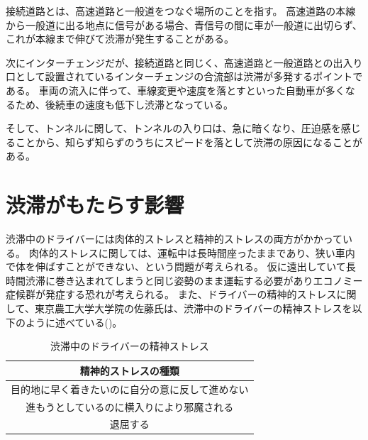 接続道路とは、高速道路と一般道をつなぐ場所のことを指す。
高速道路の本線から一般道に出る地点に信号がある場合、青信号の間に車が一般道に出切らず、これが本線まで伸びて渋滞が発生することがある\cite{zurich}。

次にインターチェンジだが、接続道路と同じく、高速道路と一般道路との出入り口として設置されているインターチェンジの合流部は渋滞が多発するポイントである\cite{zurich}。
車両の流入に伴って、車線変更や速度を落とすといった自動車が多くなるため、後続車の速度も低下し渋滞となっている。

そして、トンネルに関して、トンネルの入り口は、急に暗くなり、圧迫感を感じることから、知らず知らずのうちにスピードを落として渋滞の原因になることがある\cite{zurich}。

\newpage


\section{渋滞がもたらす影響}
渋滞中のドライバーには肉体的ストレスと精神的ストレスの両方がかかっている。
肉体的ストレスに関しては、運転中は長時間座ったままであり、狭い車内で体を伸ばすことができない、という問題が考えられる。
仮に遠出していて長時間渋滞に巻き込まれてしまうと同じ姿勢のまま運転する必要がありエコノミー症候群が発症する恐れが考えられる。
また、ドライバーの精神的ストレスに関して、東京農工大学大学院の佐藤氏\cite{alma99344256104031}は、渋滞中のドライバーの精神ストレスを以下のように述べている()。


\begin{table}[htbp]
  \centering
  \begin{scriptsize}
\begin{tabular}{c}
  \toprule
  精神的ストレスの種類 \\
  \midrule
  目的地に早く着きたいのに自分の意に反して進めない \\
  進もうとしているのに横入りにより邪魔される \\
  退屈する \\
  \bottomrule
\end{tabular}
\end{scriptsize}
\caption{渋滞中のドライバーの精神ストレス}
\label{tab:stress_of_driver}
\end{table}



